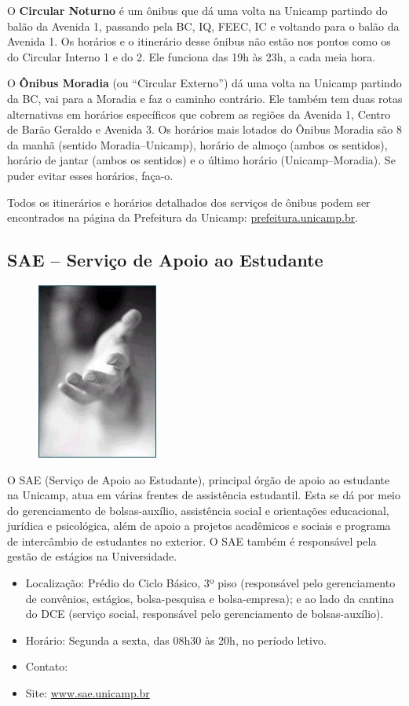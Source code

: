 O \textbf{Circular Noturno} é um ônibus que dá uma volta na Unicamp partindo do
balão da Avenida 1, passando pela BC, IQ, FEEC, IC e voltando para o balão da
Avenida 1.  Os horários e o itinerário desse ônibus não estão nos pontos como os
do Circular Interno 1 e do 2. Ele funciona das 19h às 23h, a cada meia hora.

O \textbf{Ônibus Moradia} (ou ``Circular Externo'') dá uma volta na Unicamp
partindo da BC, vai para a Moradia e faz o caminho contrário. Ele também tem
duas rotas alternativas em horários específicos que cobrem as regiões da Avenida
1, Centro de Barão Geraldo e Avenida 3. Os horários mais lotados do Ônibus
Moradia são 8 da manhã (sentido Moradia--Unicamp), horário de almoço (ambos os
sentidos), horário de jantar (ambos os sentidos) e o último horário
(Unicamp--Moradia). Se puder evitar esses horários, faça-o.

Todos os itinerários e horários detalhados dos serviços de ônibus podem ser
encontrados na página da Prefeitura da Unicamp: \url{prefeitura.unicamp.br}.

\subsection{SAE -- Serviço de Apoio ao Estudante}
\begin{figure}
    \centering
    \includegraphics[width=.2\textwidth]{img/alem_da_graduacao/sae.jpg}
\end{figure}
O SAE (Serviço de Apoio ao Estudante), principal órgão de apoio ao estudante na
Unicamp, atua em várias frentes de assistência estudantil. Esta se dá por meio do
gerenciamento de bolsas-auxílio, assistência social e orientações educacional,
jurídica e psicológica, além de apoio a projetos acadêmicos e sociais e programa
de intercâmbio de estudantes no exterior. O SAE também é responsável pela gestão
de estágios na Universidade.

\begin{itemize}
    \item  Localização: Prédio do Ciclo Básico, 3º piso (responsável pelo
        gerenciamento de convênios, estágios, bolsa-pesquisa e bolsa-empresa); e
        ao lado da cantina do DCE (serviço social, responsável pelo gerenciamento 
        de bolsas-auxílio).
    \item  Horário: Segunda a sexta, das 08h30 às 20h, no período letivo.
    \item  Contato: 
    \item  Site: \url{www.sae.unicamp.br}
\end{itemize}

